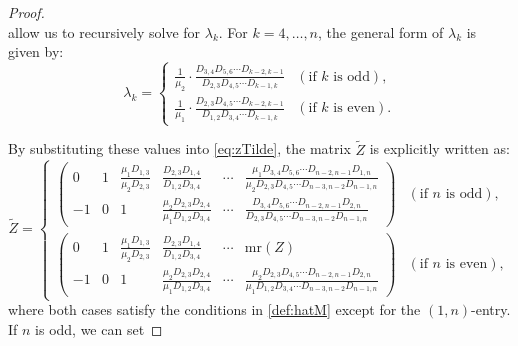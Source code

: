 \documentclass[11pt]{amsart}
\theoremstyle{plain}
\theoremstyle{definition}
\theoremstyle{remark}
\begin{document}
\begin{proof}
\begin{equation}
\end{equation}
allow us to recursively solve for $\lambda_k$. For $k = 4, \dots, n$, the general
form of $\lambda_k$ is given by:
\begin{equation}
    \lambda_k =
    \begin{cases}
    \displaystyle \frac{1}{\mu_2} \cdot \frac{D_{3,4}D_{5,6} \cdots D_{k-2,k-1}}{D_{2,3} D_{4,5} \cdots D_{k-1,k}} & (\text{if } k \text{ is odd}), \\[15pt]
    \displaystyle \frac{1}{\mu_1} \cdot \frac{D_{2,3} D_{4,5} \cdots D_{k-2,k-1}}{D_{1,2} D_{3,4} \cdots D_{k-1,k}} & (\text{if } k \text{ is even}).
    \end{cases}
\end{equation}

By substituting these values into \eqref{eq:zTilde}, the matrix $\widetilde{Z}$ is
explicitly written as:
\begin{equation}
\widetilde{Z} =
\begin{cases}
\begin{pmatrix}
0 & 1 & \displaystyle \frac{\mu_1 D_{1,3}}{\mu_2 D_{2,3}} & \displaystyle \frac{D_{2,3}D_{1,4}}{D_{1,2}D_{3,4}} & \cdots & \displaystyle \frac{\mu_1 D_{3,4}D_{5,6}\cdots D_{n-2,n-1}D_{1,n}}{\mu_2 D_{2,3}D_{4,5}\cdots D_{n-3,n-2}D_{n-1,n}} \\[12pt]
-1 & 0 & 1 & \displaystyle \frac{\mu_2 D_{2,3}D_{2,4}}{\mu_1 D_{1,2}D_{3,4}} & \cdots & \displaystyle \frac{D_{3,4}D_{5,6}\cdots D_{n-2,n-1}D_{2,n}}{D_{2,3}D_{4,5}\cdots D_{n-3,n-2}D_{n-1,n}}
\end{pmatrix} & (\text{if } n \text{ is odd}), \\[30pt]
\begin{pmatrix}
0 & 1 & \displaystyle \frac{\mu_1 D_{1,3}}{\mu_2 D_{2,3}} & \displaystyle \frac{D_{2,3} D_{1,4}}{D_{1,2} D_{3,4}} & \cdots & \mathrm{mr}(Z) \ \\[15pt]
-1 & 0 & 1 & \displaystyle \frac{\mu_2 D_{2,3} D_{2,4}}{\mu_1 D_{1,2} D_{3,4}} & \cdots &  \displaystyle \frac{\mu_2 D_{2,3}D_{4,5}\cdots D_{n-2,n-1}D_{2,n}}{\mu_1 D_{1,2}D_{3,4}\cdots D_{n-3,n-2}D_{n-1,n}}
\end{pmatrix} & (\text{if } n \text{ is even}),
\end{cases} \label{eq:hatZ}
\end{equation}
where both cases satisfy the conditions in \eqref{def:hatM} except for the
$(1,n)$-entry.
If $n$ is odd, we can set

\end{proof}
\end{document}
